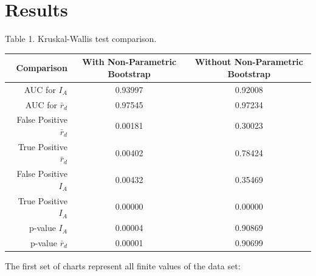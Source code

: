 \documentclass[letterpaper, 10pt]{article}
\newcommand{\tab}{\hspace*{1.5em}}
\begin{document}
\section{Results}
\tab 
Table 1. Kruskal-Wallis test comparison.
\begin{table}[ht]
\centering
\begin{tabular}{rcc}
  \hline
Comparison & With Non-Parametric Bootstrap & Without Non-Parametric Bootstrap \\ 
  \hline
AUC for $I_A$ & 0.93997 & 0.92008 \\ 
  AUC for $\bar{r}_d$ & 0.97545 & 0.97234 \\
  \hline
  False Positive $\bar{r}_d$ & 0.00181 & 0.30023 \\ 
  True Positive $\bar{r}_d$ & 0.00402 & 0.78424 \\ 
  False Positive $I_A$ & 0.00432 & 0.35469 \\ 
  True Positive $I_A$ & 0.00000 & 0.00000 \\ 
  \hline
  p-value $I_A$ & 0.00004 & 0.90869 \\ 
  p-value $\bar{r}_d$ & 0.00001 & 0.90699 \\ 
   \hline
\end{tabular}
\end{table}


The first set of charts represent all finite values of the data set:
\end{document}
